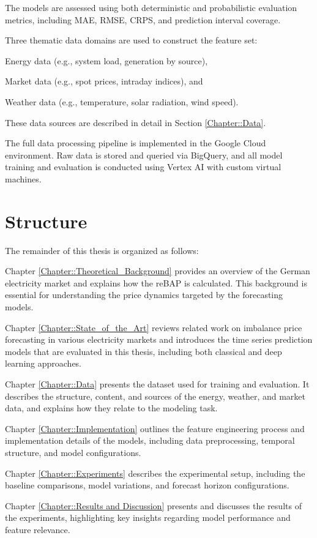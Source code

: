 \documentclass[class=scrbook, crop=false]{standalone}
\begin{document}
The models are assessed using both deterministic and probabilistic evaluation metrics, including \gls{MAE}, \gls{RMSE}, \gls{CRPS}, and prediction interval coverage.

Three thematic data domains are used to construct the feature set:

Energy data (e.g., system load, generation by source),

Market data (e.g., spot prices, intraday indices), and

Weather data (e.g., temperature, solar radiation, wind speed).

These data sources are described in detail in Section \ref{Chapter::Data}.

The full data processing pipeline is implemented in the Google Cloud environment. Raw data is stored and queried via BigQuery, and all model training and evaluation is conducted using Vertex AI with custom virtual machines.

\section{Structure}
\label{Section::Structure}
The remainder of this thesis is organized as follows:

Chapter \ref{Chapter::Theoretical_Background} provides an overview of the German electricity market and explains how the \gls{reBAP} is calculated. This background is essential for understanding the price dynamics targeted by the forecasting models.

Chapter \ref{Chapter::State_of_the_Art} reviews related work on imbalance price forecasting in various electricity markets and introduces the time series prediction models that are evaluated in this thesis, including both classical and deep learning approaches.

Chapter  \ref{Chapter::Data} presents the dataset used for training and evaluation. It describes the structure, content, and sources of the energy, weather, and market data, and explains how they relate to the modeling task.

Chapter  \ref{Chapter::Implementation} outlines the feature engineering process and implementation details of the models, including data preprocessing, temporal structure, and model configurations.

Chapter \ref{Chapter::Experiments}  describes the experimental setup, including the baseline comparisons, model variations, and forecast horizon configurations.

Chapter \ref{Chapter::Results and Discussion} presents and discusses the results of the experiments, highlighting key insights regarding model performance and feature relevance.
\end{document}
